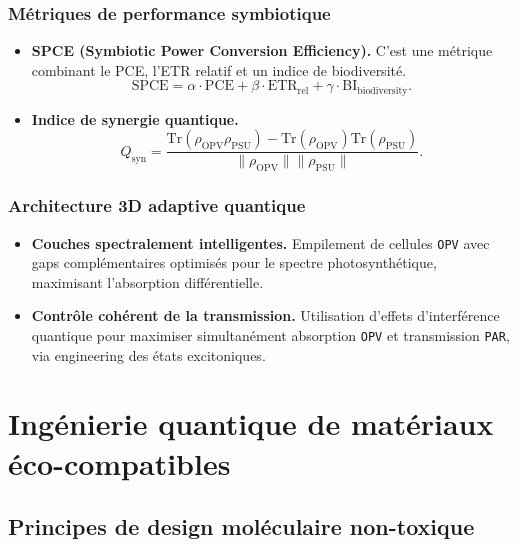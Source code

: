 \documentclass[12pt, a4paper]{article}
\begin{document}
\subsubsection{Métriques de performance symbiotique}

\begin{itemize}
    \item \textbf{SPCE (Symbiotic Power Conversion Efficiency).} C'est une métrique combinant le PCE, l'ETR relatif et un indice de biodiversité.
    \begin{equation}
    \text{SPCE} = \alpha \cdot \text{PCE} + \beta \cdot \text{ETR}_{\text{rel}} + \gamma \cdot \text{BI}_{\text{biodiversity}}.
    \end{equation}
    
    \item \textbf{Indice de synergie quantique.}
    \begin{equation}
    Q_{\text{syn}} = \frac{\text{Tr}(\rho_{\text{OPV}}\rho_{\text{PSU}}) - \text{Tr}(\rho_{\text{OPV}})\text{Tr}(\rho_{\text{PSU}})}{\|\rho_{\text{OPV}}\| \|\rho_{\text{PSU}}\|}.
    \end{equation}
\end{itemize}

\subsubsection{Architecture 3D adaptive quantique}

\begin{itemize}
    \item \textbf{Couches spectralement intelligentes.} Empilement de cellules \texttt{OPV} avec gaps complémentaires optimisés pour le spectre photosynthétique, maximisant l'absorption différentielle.
    
    \item \textbf{Contrôle cohérent de la transmission.} Utilisation d'effets d'interférence quantique pour maximiser simultanément absorption \texttt{OPV} et transmission \texttt{PAR}, via engineering des états excitoniques.
\end{itemize}

\section{Ingénierie quantique de matériaux éco-compatibles}

\subsection{Principes de design moléculaire non-toxique}
\end{document}
